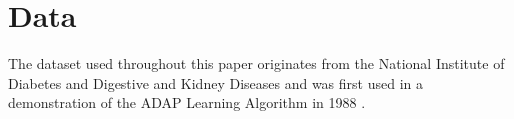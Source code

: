 \section{Data}

The dataset used throughout this paper originates from the National Institute of Diabetes and Digestive and Kidney Diseases and was first used in a demonstration of the ADAP Learning Algorithm in 1988 \cite{pima}.
